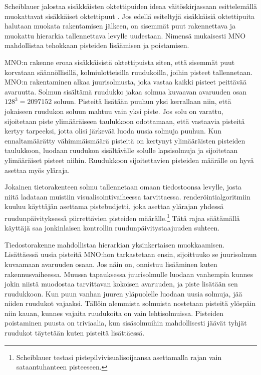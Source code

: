 Scheiblauer jalostaa sisäkkäisten oktettipuiden ideaa väitöskirjassaan esittelemällä muokattavat sisäkkäiset oktettipuut . Jos edellä esiteltyjä sisäkkäisiä oktettipuita halutaan muokata rakentamisen jälkeen, on sisemmät puut rakennettava ja muokattu hierarkia tallennettava levylle uudestaan. Nimensä mukaisesti MNO mahdollistaa tehokkaan pisteiden lisäämisen ja poistamisen. \cite{scheiblauer}  

MNO:n rakenne eroaa sisäkkäisistä oktettipuista siten, että sisemmät puut korvataan säännöllisillä, kolmiulotteisilla ruudukoilla, joihin pisteet tallennetaan. MNO:n rakentaminen alkaa juurisolmusta, joka vastaa kaikki pisteet peittävää avaruutta. Solmun sisältämä ruudukko jakaa solmua kuvaavan avaruuden osan $128^3 = 2 097 152$ soluun. Pisteitä lisätään puuhun yksi kerrallaan niin, että jokaiseen ruudukon soluun mahtuu vain yksi piste. Jos solu on varattu, sijoitetaan piste ylimääräiseen taulukkoon odottamaan, että vastaavia pisteitä kertyy tarpeeksi, jotta olisi järkevää luoda uusia solmuja puuhun. Kun ennaltamäärätty vähimmäismäärä pisteitä on kertynyt ylimääräisten pisteiden taulukkoon, luodaan ruudukon sisältävälle solulle lapsisolmuja ja sijoitetaan ylimääräiset pisteet niihin. Ruudukkoon sijoitettavien pisteiden määrälle on hyvä asettaa myös yläraja. \cite{scheiblauer}

Jokainen tietorakenteen solmu tallennetaan omaan tiedostoonsa levylle, josta niitä ladataan muistiin visualisointivaiheessa tarvittaessa. renderöintialgoritmiin kuuluu käyttäjän asettama pistebudjetti, joka asettaa ylärajan yhdessä ruudunpäivityksessä piirrettävien pisteiden määrälle.\footnote{Scheiblauer testasi pistepilvivisualisoijaansa asettamalla rajan vain sataantuhanteen pisteeseen.} Tätä rajaa säätämällä käyttäjä saa jonkinlaisen kontrollin ruudunpäivitystaajuuden suhteen. \cite{scheiblauer}

Tiedostorakenne mahdollistaa hierarkian yksinkertaisen muokkaamisen. Lisättäessä uusia pisteitä MNO:hon tarkastetaan ensin, sijoittuuko se juurisolmun kuvaamaan avaruuden osaan. Jos näin on, onnistuu lisääminen kuten rakennusvaiheessa. Muussa tapauksessa juurisolmulle luodaan vanhempia kunnes jokin niistä muodostaa tarvittavan kokoisen avaruuden, ja piste lisätään sen ruudukkoon. Kun puun vanhan juuren yläpuolelle luodaan uusia solmuja, jää niiden ruudukot vajaaksi. Tällöin alemmista solmuista nostetaan pisteitä ylöspäin niin kauan, kunnes vajaita ruudukoita on vain lehtisolmuissa. Pisteiden poistaminen puusta on triviaalia, kun sisäsolmuihin mahdollisesti jäävät tyhjät ruudukot täytetään kuten pisteitä lisättäessä. \cite{scheiblauer}


